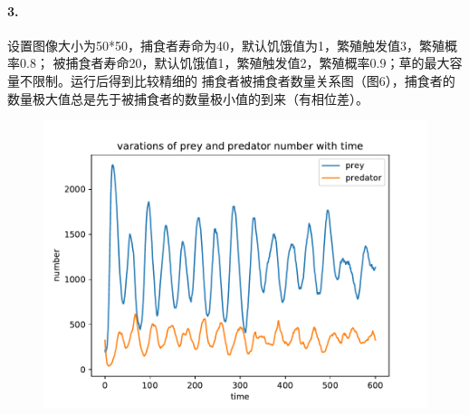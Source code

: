 \documentclass[a4paper]{ctexart}
\begin{document}
	\paragraph{3.}设置图像大小为50*50，捕食者寿命为40，默认饥饿值为1，繁殖触发值3，繁殖概率0.8；
	被捕食者寿命20，默认饥饿值1，繁殖触发值2，繁殖概率0.9；草的最大容量不限制。运行后得到比较精细的
	捕食者被捕食者数量关系图（图6），捕食者的数量极大值总是先于被捕食者的数量极小值的到来（有相位差）。
	\begin{figure}[htbp]
		\centering
		\includegraphics[scale=0.7]{demo4.pdf}
		\caption{}
	\end{figure}
\end{document}
